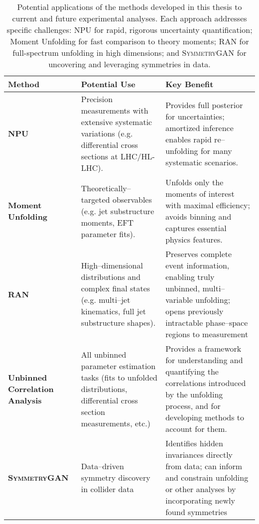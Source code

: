         \begin{table}
            \centering
            \begin{tabular}{p{3.5cm} p{5.8cm} p{6.5cm}}
                \textbf{Method} & \textbf{Potential Use} & \textbf{Key Benefit} \\
                \hline
                \textbf{NPU}
                & Precision measurements with extensive systematic variations (e.g. differential cross sections at LHC/HL-LHC).
                & Provides full posterior for uncertainties; amortized inference enables rapid re--unfolding for many systematic scenarios. \\
                \textbf{Moment Unfolding}
                & Theoretically--targeted observables (e.g. jet substructure moments, EFT parameter fits).
                & Unfolds only the moments of interest with maximal efficiency; avoids binning and captures essential physics features. \\
                \textbf{RAN}
                & High--dimensional distributions and complex final states (e.g. multi--jet kinematics, full jet substructure shapes).
                & Preserves complete event information, enabling truly unbinned, multi--variable unfolding; opens previously intractable phase--space regions to measurement \\
                \textbf{Unbinned Correlation Analysis}
                & All unbinned parameter estimation tasks (fits to unfolded distributions, differential cross section measurements, etc.)
                & Provides a framework for understanding and quantifying the correlations introduced by the unfolding process, and for developing methods to account for them. \\
                \textbf{\textsc{SymmetryGAN}}
                & Data--driven symmetry discovery in collider data
                & Identifies hidden invariances directly from data; can inform and constrain unfolding or other analyses by incorporating newly found symmetries\\
            \end{tabular}
            \caption[Applications of methods to experimental scenarios]{
                Potential applications of the methods developed in this thesis to current and future experimental analyses. Each approach addresses specific challenges: NPU for rapid, rigorous uncertainty quantification; Moment Unfolding for fast comparison to theory moments; RAN for full-spectrum unfolding in high dimensions; and \textsc{SymmetryGAN} for uncovering and leveraging symmetries in data.
            }
            \label{tab:method_applications}
        \end{table}
